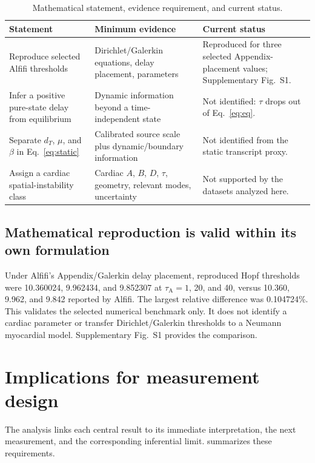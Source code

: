 \documentclass[preprint,11pt]{elsarticle}
\begin{document}
\begin{table}[!htbp]
\centering
\caption{Mathematical statement, evidence requirement, and current status.}
\label{tab:mathclaims}
\small
\begin{tabularx}{\linewidth}{YYY}
\toprule
\textbf{Statement} & \textbf{Minimum evidence} & \textbf{Current status}\\
\midrule
Reproduce selected Alfifi thresholds & Dirichlet/Galerkin equations, delay placement, parameters & Reproduced for three selected Appendix-placement values; Supplementary Fig.~S1.\\
Infer a positive pure-state delay from equilibrium & Dynamic information beyond a time-independent state & Not identified: $\tau$ drops out of Eq.~\eqref{eq:eq}.\\
Separate $d_T$, $\mu$, and $\beta$ in Eq.~\eqref{eq:static} & Calibrated source scale plus dynamic/boundary information & Not identified from the static transcript proxy.\\
Assign a cardiac spatial-instability class & Cardiac $A$, $B$, $D$, $\tau$, geometry, relevant modes, uncertainty & Not supported by the datasets analyzed here.\\
\bottomrule
\end{tabularx}
\end{table}


\subsection{Mathematical reproduction is valid within its own formulation}
Under Alfifi's Appendix/Galerkin delay placement, reproduced Hopf thresholds were 10.360024, 9.962434, and 9.852307 at $\tau_{\mathrm A}=1$, 20, and 40, versus 10.360, 9.962, and 9.842 reported by Alfifi. The largest relative difference was 0.104724\%. This validates the selected numerical benchmark only. It does not identify a cardiac parameter or transfer Dirichlet/Galerkin thresholds to a Neumann myocardial model. Supplementary Fig.~S1 provides the comparison.

\section{Implications for measurement design}
The analysis links each central result to its immediate interpretation, the next measurement, and the corresponding inferential limit.  summarizes these requirements.
\end{document}
